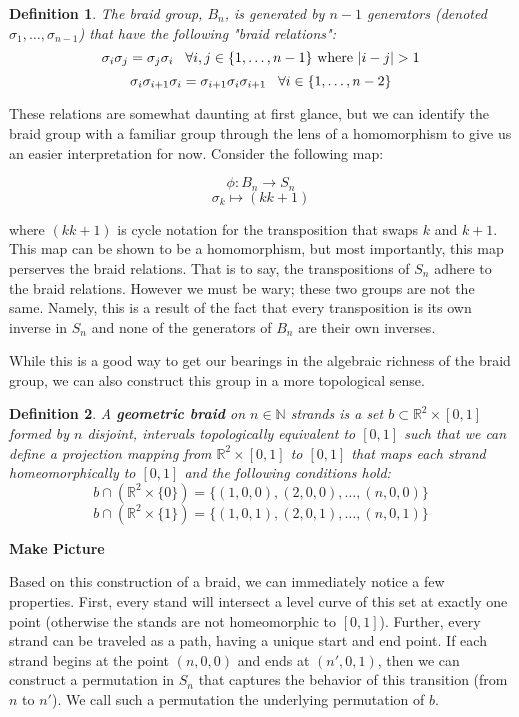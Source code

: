 \documentclass[10pt]{ucthesis}
\newcommand{\R}{\mathbb{R}}
\newcommand{\N}{\mathbb{N}}
\newtheorem{definition}{Definition}[chapter]
\begin{document}
\begin{definition}
	The braid group, $B_n$, is generated by $n-1$ generators (denoted $\sigma_1,\hdots,\sigma_{n-1}$) that have the following "braid relations":
$$\sigma_i\sigma_j = \sigma_j\sigma_i \hspace{3mm} \forall i,j \in \{1,\hdots,n-1\} \text{ where } |i-j|>1$$
$$\sigma_i\sigma_{i+1}\sigma_i=\sigma_{i+1}\sigma_i\sigma_{i+1} \hspace{3mm} \forall i \in \{1,\hdots,n-2\}$$
\end{definition}

These relations are somewhat daunting at first glance, but we can identify the braid group with a familiar group through the lens of a homomorphism to give us an easier interpretation for now. Consider the following map:

$$\phi:B_n\rightarrow S_n$$
$$\sigma_k \mapsto (k k+1)$$

where $(k k+1)$ is cycle notation for the transposition that swaps $k$ and $k+1$. This map can be shown to be a homomorphism, but most importantly, this map perserves the braid relations. That is to say, the transpositions of $S_n$ adhere to the braid relations. However we must be wary; these two groups are not the same. Namely, this is a result of the fact that every transposition is its own inverse in $S_n$ and none of the generators of $B_n$ are their own inverses. 

While this is a good way to get our bearings in the algebraic richness of the braid group, we can also construct this group in a more topological sense.

\begin{definition}
	A \textbf{geometric braid} on $n\in \N$ strands is a set $b\subset\R^2\times [0,1]$ formed by $n$ disjoint, intervals topologically equivalent to $[0,1]$ such that we can define a projection mapping from $\R^2\times [0,1]$ to $[0,1]$ that maps each strand homeomorphically to $[0,1]$ and the following conditions hold:
$$b\cap(\R^2\times\{0\}) = \{(1,0,0),(2,0,0),\hdots,(n,0,0)\}$$
$$b\cap(\R^2\times\{1\}) = \{(1,0,1),(2,0,1),\hdots,(n,0,1)\}$$
\end{definition}

\textbf{Make Picture}

Based on this construction of a braid, we can immediately notice a few properties. First, every stand will intersect a level curve of this set at exactly one point (otherwise the stands are not homeomorphic to $[0,1]$). Further, every strand can be traveled as a path, having a unique start and end point. If each strand begins at the point $(n,0,0)$ and ends at $(n',0,1)$, then we can construct a permutation in $S_n$ that captures the behavior of this transition (from $n$ to $n'$). We call such a permutation the underlying permutation of $b$.
\end{document}
